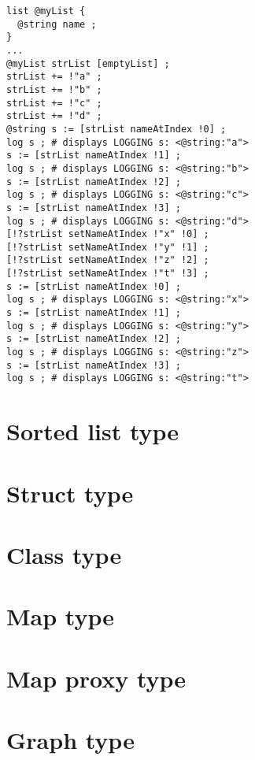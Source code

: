 \begin{lstlisting}[language=galgas]
list @myList {
  @string name ;
}
...
@myList strList [emptyList] ;
strList += !"a" ;
strList += !"b" ;
strList += !"c" ;
strList += !"d" ;
@string s := [strList nameAtIndex !0] ;
log s ; # displays LOGGING s: <@string:"a">
s := [strList nameAtIndex !1] ;
log s ; # displays LOGGING s: <@string:"b">
s := [strList nameAtIndex !2] ;
log s ; # displays LOGGING s: <@string:"c">
s := [strList nameAtIndex !3] ;
log s ; # displays LOGGING s: <@string:"d">
[!?strList setNameAtIndex !"x" !0] ;
[!?strList setNameAtIndex !"y" !1] ;
[!?strList setNameAtIndex !"z" !2] ;
[!?strList setNameAtIndex !"t" !3] ;
s := [strList nameAtIndex !0] ;
log s ; # displays LOGGING s: <@string:"x">
s := [strList nameAtIndex !1] ;
log s ; # displays LOGGING s: <@string:"y">
s := [strList nameAtIndex !2] ;
log s ; # displays LOGGING s: <@string:"z">
s := [strList nameAtIndex !3] ;
log s ; # displays LOGGING s: <@string:"t">
\end{lstlisting}















\section{Sorted list type}


\section{Struct type}



\section{Class type}


\section{Map type}


\section{Map proxy type}




\section{Graph type}


